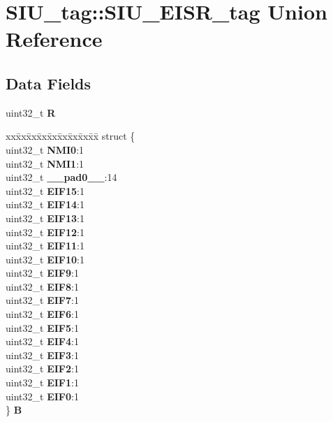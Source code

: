 \hypertarget{unionSIU__tag_1_1SIU__EISR__tag}{}\section{S\+I\+U\+\_\+tag\+::S\+I\+U\+\_\+\+E\+I\+S\+R\+\_\+tag Union Reference}
\label{unionSIU__tag_1_1SIU__EISR__tag}
\subsection*{Data Fields}
\begin{DoxyCompactItemize}
\item 
\mbox{\label{unionSIU__tag_1_1SIU__EISR__tag_a33d5ae98d3db0b2f10b70d5cfbad592f}} 
uint32\+\_\+t {\bfseries R}
\item 
\mbox{\label{unionSIU__tag_1_1SIU__EISR__tag_a2bca7478a1059849b342ab399238ce86}} 
\begin{tabbing}
xx\=xx\=xx\=xx\=xx\=xx\=xx\=xx\=xx\=\kill
struct \{\\
\>uint32\_t {\bfseries NMI0}:1\\
\>uint32\_t {\bfseries NMI1}:1\\
\>uint32\_t {\bfseries \_\_pad0\_\_}:14\\
\>uint32\_t {\bfseries EIF15}:1\\
\>uint32\_t {\bfseries EIF14}:1\\
\>uint32\_t {\bfseries EIF13}:1\\
\>uint32\_t {\bfseries EIF12}:1\\
\>uint32\_t {\bfseries EIF11}:1\\
\>uint32\_t {\bfseries EIF10}:1\\
\>uint32\_t {\bfseries EIF9}:1\\
\>uint32\_t {\bfseries EIF8}:1\\
\>uint32\_t {\bfseries EIF7}:1\\
\>uint32\_t {\bfseries EIF6}:1\\
\>uint32\_t {\bfseries EIF5}:1\\
\>uint32\_t {\bfseries EIF4}:1\\
\>uint32\_t {\bfseries EIF3}:1\\
\>uint32\_t {\bfseries EIF2}:1\\
\>uint32\_t {\bfseries EIF1}:1\\
\>uint32\_t {\bfseries EIF0}:1\\
\} {\bfseries B}\\


\end{tabbing}
\end{DoxyCompactItemize}
